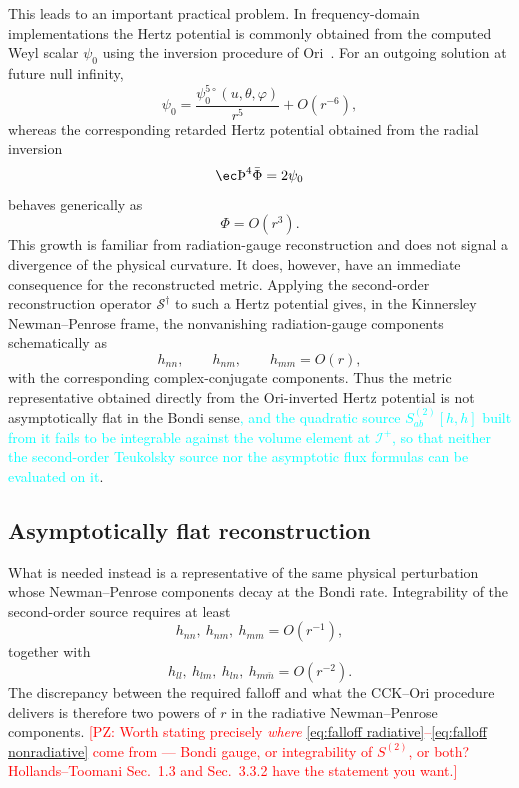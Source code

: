 \documentclass[preprint,aps,nofootinbib,a4paper,superscriptaddress,longbibliography,amsfonts, amssymb,amsmath,titlepage]{revtex4-1}
\numberwithin{equation}{section} %
\newcommand{\PZ}[1]{\textcolor{red}{\textsf{[PZ: #1]}}}
\newcommand{\newtext}[1]{\textcolor{cyan}{#1}}
\def\th{\hbox{\ec\char'336}}
\renewcommand{\S}{{\mathcal S}}
\def\beq{\begin{equation}}
\def\eeq{\end{equation}}
\def\beq{\begin{equation}}
\def\eeq{\end{equation}}
\def\psifive{\psi^{5\circ}_{0}}
\def\scri{\mathscr{I}^{+}}
\begin{document}
This leads to an important practical problem.  In frequency-domain
implementations the Hertz potential is commonly obtained from the
computed Weyl scalar $\psi_0$ using the inversion procedure of
Ori~\cite{Ori:2002uv}.
For an outgoing solution at future null infinity,
\begin{equation}\label{eq:psi0 asy}
\psi_0
=
\frac{\psifive(u,\theta,\varphi)}{r^5}
+O(r^{-6}),
\end{equation}
whereas the corresponding retarded Hertz potential obtained from the
radial inversion
\beq\label{eq:inv rel}
	\th^4 \bar\Phi =2 \psi_0
\eeq
behaves generically as
\begin{equation}
\Phi = O(r^3).
\end{equation}
This growth is familiar from radiation-gauge reconstruction and does
not signal a divergence of the physical curvature.  It does, however,
have an immediate consequence for the reconstructed metric.  Applying
the second-order reconstruction operator $\S^{\dagger}$ to
such a Hertz potential gives, in the Kinnersley Newman--Penrose frame,
the nonvanishing radiation-gauge components schematically as
\begin{equation}
h_{nn},\qquad h_{nm},\qquad h_{mm}
=
O(r),
\end{equation}
with the corresponding complex-conjugate components.  Thus the metric
representative obtained directly from the Ori-inverted Hertz potential
is not asymptotically flat in the Bondi sense\newtext{, and the
quadratic source $S^{(2)}_{ab}[h,h]$ built from it fails to be integrable
against the volume element at $\scri$, so that neither the second-order
Teukolsky source nor the asymptotic flux formulas can be evaluated on it}.

\subsection{Asymptotically flat reconstruction}
\label{sec:af reconstruction}
What is needed instead is a representative of the same physical perturbation
whose Newman--Penrose components decay at the Bondi rate.  Integrability of
the second-order source requires at least
\begin{equation}\label{eq:falloff radiative}
h_{nn},\ h_{nm}, \ h_{mm}
= O(r^{-1}),
\end{equation}
together with
\begin{equation}\label{eq:falloff nonradiative}
h_{ll},\ h_{lm},\ h_{ln},\ h_{m\bar m}
=
O(r^{-2}).
\end{equation}
The discrepancy between the required falloff and what the CCK--Ori
procedure delivers is therefore two powers of $r$ in the radiative
Newman--Penrose components.
\PZ{Worth stating precisely \emph{where}
\eqref{eq:falloff radiative}--\eqref{eq:falloff nonradiative} come from ---
Bondi gauge, or integrability of $S^{(2)}$, or both?  Hollands--Toomani
Sec.~1.3 and Sec.~3.3.2 have the statement you want.}
\end{document}
